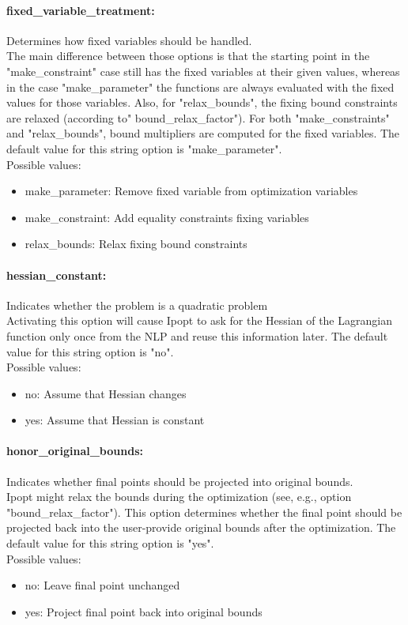 \paragraph{fixed\_variable\_treatment:}\label{opt:fixed_variable_treatment} Determines how fixed variables should be handled. \\
 The main difference between those options is that the starting point in the "make\_constraint" case still has the fixed variables at their given values, whereas in the case "make\_parameter" the functions are always evaluated with the fixed values for those variables.  Also, for "relax\_bounds", the fixing bound constraints are relaxed (according to" bound\_relax\_factor"). For both "make\_constraints" and "relax\_bounds", bound multipliers are computed for the fixed variables. The default value for this string option is "make\_parameter".
\\ 
Possible values:
\begin{itemize}
   \item make\_parameter: Remove fixed variable from optimization variables
   \item make\_constraint: Add equality constraints fixing variables
   \item relax\_bounds: Relax fixing bound constraints
\end{itemize}

\paragraph{hessian\_constant:}\label{opt:hessian_constant} Indicates whether the problem is a quadratic problem \\
 Activating this option will cause Ipopt to ask for the Hessian of the Lagrangian function only once from the NLP and reuse this information later. The default value for this string option is "no".
\\ 
Possible values:
\begin{itemize}
   \item no: Assume that Hessian changes
   \item yes: Assume that Hessian is constant
\end{itemize}

\paragraph{honor\_original\_bounds:}\label{opt:honor_original_bounds} Indicates whether final points should be projected into original bounds. \\
 Ipopt might relax the bounds during the optimization (see, e.g., option "bound\_relax\_factor").  This option determines whether the final point should be projected back into the user-provide original bounds after the optimization. The default value for this string option is "yes".
\\ 
Possible values:
\begin{itemize}
   \item no: Leave final point unchanged
   \item yes: Project final point back into original bounds
\end{itemize}

